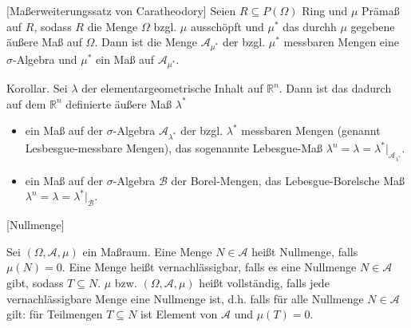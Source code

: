 \documentclass[fleqn,draft,a5paper]{article}
\theoremstyle{remark}
\begin{document}
[Maßerweiterungssatz von Caratheodory]  Seien \(R \subseteq P(\Omega)\) Ring und \(\mu\)
Prämaß auf \(R\), sodass \(R\) die Menge \(\Omega\) bzgl. \(\mu\) ausschöpft und
\(\mu^{\ast}\) das durchh \(\mu\) gegebene äußere Maß auf \(\Omega\).  Dann ist die
Menge \(\mathcal{A}_{\mu^{\ast}}\) der bzgl. \(\mu^{\ast}\) messbaren Mengen eine \(\sigma\)-Algebra
und \(\mu^{\ast}\) ein Maß auf \(\mathcal{A}_{\mu^{\ast}}\).

Korollar.  Sei \(\lambda\) der elementargeometrische Inhalt auf \(\mathbb{R}^{n}\).  Dann
ist das dadurch auf dem \(\mathbb{R}^{n}\) definierte äußere Maß \(\lambda^{\ast}\)
\begin{itemize}
\item ein Maß auf der \(\sigma\)-Algebra \(\mathcal{A}_{\lambda^{\ast}}\) der bzgl. \(\lambda^{\ast}\)
  messbaren Mengen (genannt Lesbesgue-messbare Mengen), das sogenannte
  Lebesgue-Maß \(\lambda^{n} = \lambda = \lambda^{\ast} \vert_{\mathcal{A}_{\lambda^{\ast}}}\).
\item ein Maß auf der \(\sigma\)-Algebra \(\mathcal{B}\) der Borel-Mengen, das
  Lebesgue-Borelsche Maß \(\lambda^{n} = \lambda = \lambda^{\ast} \vert_{\mathcal{B}}\).
\end{itemize}

[Nullmenge]

Sei \((\Omega, \mathcal{A}, \mu)\) ein Maßraum.  Eine Menge \(N \in \mathcal{A}\) heißt Nullmenge,
falls \(\mu(N) = 0\).  Eine Menge heißt vernachlässigbar, falls es eine
Nullmenge \(N \in \mathcal{A}\) gibt, sodass \(T \subseteq N\).  \(\mu\) bzw. \((\Omega, \mathcal{A}, \mu)\) heißt
vollständig, falls jede vernachlässigbare Menge eine Nullmenge ist,
d.h. falls  für alle Nullmenge \(N \in \mathcal{A}\) gilt: für Teilmengen \(T \subseteq N\)
ist Element von \(\mathcal{A}\) und \(\mu(T) = 0\).
\end{document}
